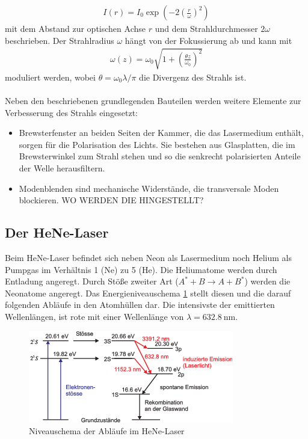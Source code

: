 \begin{align}
	I(r) = I_0\exp\left(-2\left(\frac{r}{\omega}\right)^2\right)
\end{align}
mit dem Abstand zur optischen Achse $r$ und dem Strahldurchmesser $2\omega$ beschrieben. Der Strahlradius $\omega$ hängt von der Fokussierung ab und kann mit
\begin{align}
	\omega(z) = \omega_0\sqrt{1+\left(\frac{\theta z}{\omega_0}\right)^2}
\end{align}
moduliert werden, wobei $\theta = \omega_0\lambda\slash\pi$ die Divergenz des Strahls ist. \\
\ \\
Neben den beschriebenen grundlegenden Bauteilen werden weitere Elemente zur Verbesserung des Strahls eingesetzt:
\begin{itemize}
	\item Brewsterfenster an beiden Seiten der Kammer, die das Lasermedium enthält, sorgen für die Polarisation des Lichts. Sie bestehen aus Glasplatten, die im Brewsterwinkel zum Strahl stehen und so die senkrecht polarisierten Anteile der Welle herausfiltern.
	\item Modenblenden sind mechanische Widerstände, die transversale Moden blockieren. WO WERDEN DIE HINGESTELLT?
\end{itemize}
\subsection{Der HeNe-Laser}
Beim HeNe-Laser befindet sich neben Neon als Lasermedium noch Helium als Pumpgas im Verhältnis 1 (Ne) zu 5 (He). Die Heliumatome werden durch Entladung angeregt. Durch Stöße zweiter Art ($A^* + B \rightarrow A + B^*$) werden die Neonatome angeregt. Das Energieniveauschema \ref{fig:Niveaus} stellt diesen und die darauf folgenden Abläufe in den Atomhüllen dar. Die intensivste der emittierten Wellenlängen, ist rote mit einer Wellenlänge von $\lambda = \SI{632.8}{\nano\metre}$.
\begin{figure}[h!]
	\centering
	\includegraphics[width=.6\textwidth]{Niveauschema.png}
	\caption{Niveauschema der Abläufe im HeNe-Laser \cite{Niveaus}}
	\label{fig:Niveaus}
\end{figure}